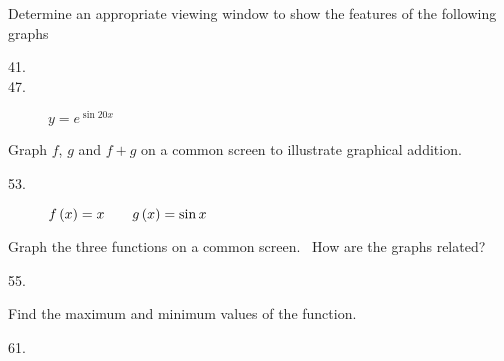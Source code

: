 Determine an appropriate viewing window to show the features of the following graphs 


\begin{description}
\item [41.]   
\columnsep =30pt
 

\item [47.]
$y =e^{\sin  20 x}$ \end{description}

Graph $f$, $g$ and $f +g$ on a common screen to illustrate graphical addition. 


\begin{description}
\item [53.] $f \left (x\right ) =x\text{\quad \quad }g \left (x\right ) =\sin  x$ \end{description}

Graph the three functions on a common screen. \ How
are the graphs related? 


\begin{description}
\item [55.]   
\columnsep =30pt
 \end{description}

Find the maximum and minimum values of the function. 


\begin{description}
\item [61.]   
\columnsep =30pt
 \end{description}

